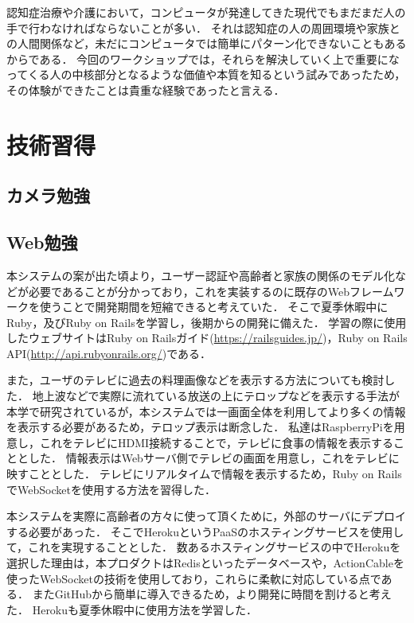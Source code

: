 \documentclass[../report]{subfiles}
\begin{document}
認知症治療や介護において，コンピュータが発達してきた現代でもまだまだ人の手で行わなければならないことが多い．
それは認知症の人の周囲環境や家族との人間関係など，未だにコンピュータでは簡単にパターン化できないこともあるからである．
今回のワークショップでは，それらを解決していく上で重要になってくる人の中核部分となるような価値や本質を知るという試みであったため，その体験ができたことは貴重な経験であったと言える．


\section{技術習得}
\subsection{カメラ勉強}


\subsection{Web勉強}
本システムの案が出た頃より，ユーザー認証や高齢者と家族の関係のモデル化などが必要であることが分かっており，これを実装するのに既存のWebフレームワークを使うことで開発期間を短縮できると考えていた．
そこで夏季休暇中にRuby，及びRuby on Railsを学習し，後期からの開発に備えた．
学習の際に使用したウェブサイトはRuby on Railsガイド(\url{https://railsguides.jp/})，Ruby on Rails API(\url{http://api.rubyonrails.org/})である．

また，ユーザのテレビに過去の料理画像などを表示する方法についても検討した．
地上波などで実際に流れている放送の上にテロップなどを表示する手法が本学で研究されているが，本システムでは一画面全体を利用してより多くの情報を表示する必要があるため，テロップ表示は断念した．
私達はRaspberryPiを用意し，これをテレビにHDMI接続することで，テレビに食事の情報を表示することとした．
情報表示はWebサーバ側でテレビの画面を用意し，これをテレビに映すこととした．
テレビにリアルタイムで情報を表示するため，Ruby on RailsでWebSocketを使用する方法を習得した．

本システムを実際に高齢者の方々に使って頂くために，外部のサーバにデプロイする必要があった．
そこでHerokuというPaaSのホスティングサービスを使用して，これを実現することとした．
数あるホスティングサービスの中でHerokuを選択した理由は，本プロダクトはRedisといったデータベースや，ActionCableを使ったWebSocketの技術を使用しており，これらに柔軟に対応している点である．
またGitHubから簡単に導入できるため，より開発に時間を割けると考えた．
Herokuも夏季休暇中に使用方法を学習した．
\end{document}
